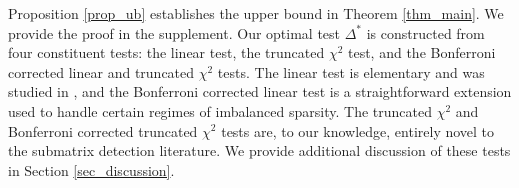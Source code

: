 \documentclass{article}
\newcommand{\R}{\mathbb{R}}
\newcommand{\X}{\mathbf{X}}
\newcommand{\Y}{\mathbf{Y}}
\newcommand{\one}{\mathds{1}}
\newcommand{\chisqlin}{\text{trunc-$\chi^2$}}
\newcommand{\chisqmax}{\text{max-trunc-$\chi^2$}}
\theoremstyle{remark}
\begin{document}
Proposition \ref{prop_ub} establishes the upper bound in Theorem \ref{thm_main}. We provide the proof in the supplement. Our optimal test $\Delta^*$ is constructed from four constituent tests: the linear test, the truncated $\chi^2$ test, and the Bonferroni corrected linear and truncated $\chi^2$ tests. The linear test is elementary and was studied in \citet{butucea2013detection}, and the Bonferroni corrected linear test is a straightforward extension used to handle certain regimes of imbalanced sparsity. The truncated $\chi^2$ and Bonferroni corrected truncated $\chi^2$ tests are, to our knowledge, entirely novel to the submatrix detection literature. We provide additional discussion of these tests in Section \ref{sec_discussion}.

% 
\end{document}

